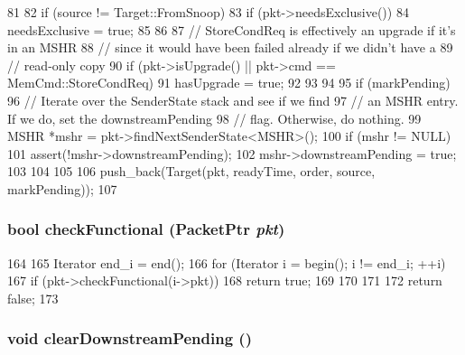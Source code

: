 \begin{DoxyCode}
81 {
82     if (source != Target::FromSnoop) {
83         if (pkt->needsExclusive()) {
84             needsExclusive = true;
85         }
86 
87         // StoreCondReq is effectively an upgrade if it's in an MSHR
88         // since it would have been failed already if we didn't have a
89         // read-only copy
90         if (pkt->isUpgrade() || pkt->cmd == MemCmd::StoreCondReq) {
91             hasUpgrade = true;
92         }
93     }
94 
95     if (markPending) {
96         // Iterate over the SenderState stack and see if we find
97         // an MSHR entry. If we do, set the downstreamPending
98         // flag. Otherwise, do nothing.
99         MSHR *mshr = pkt->findNextSenderState<MSHR>();
100         if (mshr != NULL) {
101             assert(!mshr->downstreamPending);
102             mshr->downstreamPending = true;
103         }
104     }
105 
106     push_back(Target(pkt, readyTime, order, source, markPending));
107 }
\end{DoxyCode}
\hypertarget{classMSHR_1_1TargetList_a8eb60d4744b6212ad749f3a586759266}{
\subsubsection[{checkFunctional}]{\setlength{\rightskip}{0pt plus 5cm}bool checkFunctional ({\bf PacketPtr} {\em pkt})}}
\label{classMSHR_1_1TargetList_a8eb60d4744b6212ad749f3a586759266}



\begin{DoxyCode}
164 {
165     Iterator end_i = end();
166     for (Iterator i = begin(); i != end_i; ++i) {
167         if (pkt->checkFunctional(i->pkt)) {
168             return true;
169         }
170     }
171 
172     return false;
173 }
\end{DoxyCode}
\hypertarget{classMSHR_1_1TargetList_aba459a1fb9c4f01c1911655c1db0e8e4}{
\subsubsection[{clearDownstreamPending}]{\setlength{\rightskip}{0pt plus 5cm}void clearDownstreamPending ()}}
\label{classMSHR_1_1TargetList_aba459a1fb9c4f01c1911655c1db0e8e4}



